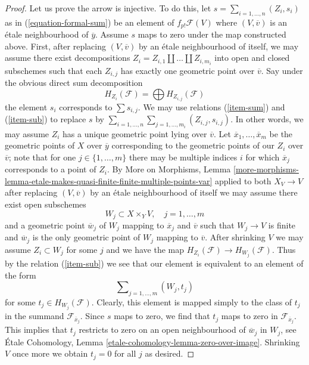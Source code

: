 \begin{proof}
\medskip\noindent
Let us prove the arrow is injective. To do this, let
$s = \sum_{i = 1, \ldots, n} (Z_i, s_i)$ as in (\ref{equation-formal-sum})
be an element of $f_{p!}\mathcal{F}(V)$ where $(V, \overline{v})$ is an
\'etale neighbourhood of $\overline{y}$. Assume $s$ maps to zero
under the map constructed above. First, after replacing
$(V, \overline{v})$ by an \'etale neighbourhood of itself,
we may assume there exist decompositions
$Z_i = Z_{i, 1} \amalg \ldots \amalg Z_{i, m_i}$ into open and closed
subschemes such that each $Z_{i, j}$ has exactly one geometric point
over $\overline{v}$. Say under the obvious direct sum decomposition
$$
H_{Z_i}(\mathcal{F}) = \bigoplus H_{Z_{i, j}}(\mathcal{F})
$$
the element $s_i$ corresponds to $\sum s_{i, j}$. We may use relations
(\ref{item-sum}) and (\ref{item-sub}) to replace $s$ by
$\sum_{i = 1, \ldots, n} \sum_{j = 1, \ldots, m_i} (Z_{i, j}, s_{i, j})$.
In other words, we may assume $Z_i$ has a unique geometric point
lying over $\overline{v}$. Let $\overline{x}_1, \ldots, \overline{x}_m$
be the geometric points of $X$ over $\overline{y}$ corresponding to
the geometric points of our $Z_i$ over $\overline{v}$; note that for
one $j \in \{1, \ldots, m\}$ there may be multiple indices $i$ for which
$\overline{x}_j$ corresponds to a point of $Z_i$.
By More on Morphisms, Lemma
\ref{more-morphisms-lemma-etale-makes-quasi-finite-finite-multiple-points-var}
applied to both $X_V \to V$
after replacing $(V, \overline{v})$ by an \'etale neighbourhood of itself
we may assume there exist open subschemes
$$
W_j \subset X \times_Y V,\quad j = 1, \ldots, m
$$
and a geometric point $\overline{w}_j$ of $W_j$ mapping to $\overline{x}_j$ and
$\overline{v}$ such that $W_j \to V$ is finite and $\overline{w}_j$ is the
only geometric point of $W_j$ mapping to $\overline{v}$.
After shrinking $V$ we may assume $Z_i \subset W_j$ for some $j$
and we have the map $H_{Z_i}(\mathcal{F}) \to H_{W_j}(\mathcal{F})$.
Thus by the relation (\ref{item-sub})
we see that our element is equivalent to an element of the form
$$
\sum\nolimits_{j = 1, \ldots, m} (W_j, t_j)
$$
for some $t_j \in H_{W_j}(\mathcal{F})$. Clearly, this element is mapped
simply to the class of $t_j$ in the summand $\mathcal{F}_{\overline{x}_j}$.
Since $s$ maps to zero, we find that $t_j$ maps to zero in
$\mathcal{F}_{\overline{x}_j}$. This implies that $t_j$ restricts
to zero on an open neighbourhood of $\overline{w}_j$ in $W_j$, see
\'Etale Cohomology, Lemma \ref{etale-cohomology-lemma-zero-over-image}.
Shrinking $V$ once more we obtain $t_j = 0$ for all $j$ as desired.
\end{proof}

